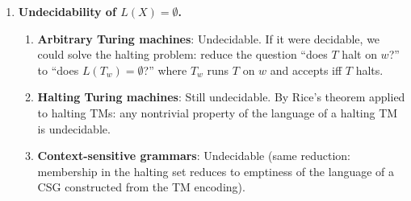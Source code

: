 \begin{enumerate}[{12.}1. ]
\begin{enumerate}
Encoding:
- Terminals: $a \mapsto \texttt{00}$, $b \mapsto \texttt{01}$.
- Nonterminal $N_i \mapsto \texttt{1}^i\texttt{0}$ (unary encoding with terminator).
- Productions: $\alpha\to\beta$ encoded as $\overline{\alpha}\texttt{\#\#}\overline{\beta}$ where $\overline{x}$ is the encoding of $x$ symbol by symbol.
- Grammar: list of productions separated by $\texttt{\#\#\#}$, preceded by the start symbol encoding.

This encoding handles an unbounded number of nonterminals via unary encoding and terminates on any finite grammar.

\item \textbf{Algorithm to decide valid CSG encoding}:
\begin{enumerate}
\item Parse the encoding to extract the alphabet, nonterminal list, start symbol, and productions.
\item Check that: (a) terminal symbols are from $\{a,b\}$; (b) nonterminals are distinct and properly encoded; (c) each production $\alpha\to\beta$ has $|\beta|\geq|\alpha|$ (context-sensitive condition), except possibly $Z\to\lambda$.
\item Verify the syntactic structure of the encoding (valid separators, well-formed strings).
\item The TM accepts valid encodings and rejects invalid ones. Terminates in polynomial time in the encoding length. \qed
\end{enumerate}
\end{enumerate}

\item \textbf{Undecidability of $L(X)=\emptyset$.}

\begin{enumerate}
\item \textbf{Arbitrary Turing machines}: Undecidable. If it were decidable, we could solve the halting problem: reduce the question ``does $T$ halt on $w$?'' to ``does $L(T_{w})=\emptyset$?'' where $T_w$ runs $T$ on $w$ and accepts iff $T$ halts.

\item \textbf{Halting Turing machines}: Still undecidable. By Rice's theorem applied to halting TMs: any nontrivial property of the language of a halting TM is undecidable.

\item \textbf{Context-sensitive grammars}: Undecidable (same reduction: membership in the halting set reduces to emptiness of the language of a CSG constructed from the TM encoding).


\end{enumerate}
\end{enumerate}
